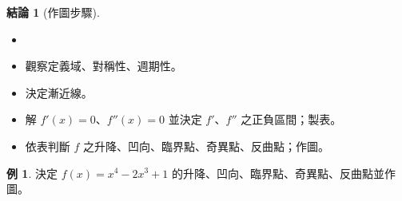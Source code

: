 \documentclass[12pt]{extarticle}
\newcommand{\ds}{\displaystyle}
\theoremstyle{definition}
\newtheorem*{fact}{結論}
\newtheorem*{ex}{例}
\begin{document}
\begin{fact}[作圖步驟]
  \begin{itemize}\setlength\itemsep{0em}
    \item[]
    \item 觀察定義域、對稱性、週期性。
    \item 決定漸近線。
    \item 解 $f'(x) = 0$、$f''(x) = 0$ 並決定 $f'$、$f''$ 之正負區間；製表。
    \item 依表判斷 $f$ 之升降、凹向、臨界點、奇異點、反曲點；作圖。
  \end{itemize}
\end{fact}

\begin{ex}
  決定 $\ds f(x) = x^4 - 2 x^3 + 1$ 的升降、凹向、臨界點、奇異點、反曲點並作圖。
\end{ex}
\end{document}
